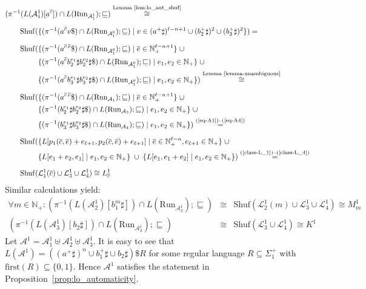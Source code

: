 \documentclass[envcountsame]{llncs}
\newcommand{\A}{\mathcal A}
\newcommand{\first}{\mathrm{first}}
\renewcommand{\L}{\mathcal L}
\newcommand{\N}{\mathbb N}
\renewcommand{\L}{\mathcal L}
\newcommand{\Run}{\mathrm{Run}}
\newcommand{\Shuf}{\mathrm{Shuf}}
\begin{document}
\begin{align*}
& (\pi^{-1}(L(\A^1_1)[a^{\overline{c}}]) \cap L(\Run_{\A^1_1}); \sqsubseteq) 
\stackrel{\text{Lemma~\ref{lem:lo_aut_shuf}}}{\cong} \\[2mm]
& \qquad \Shuf(\{(\pi^{-1}(a^{\overline{c}} v \$) \cap L(\Run_{\A^0_1}); \sqsubseteq) \mid v\in (a^+\sharp)^{\ell-n+1} \cup
    (b_2^+\sharp)^2  \cup (b_3^+\sharp)^2 \}) = \\[2mm]
& \qquad \Shuf(\{(\pi^{-1}(a^{\overline{c}\,\overline{e}} \$) \cap
                  L(\Run_{\A^0_1}); \sqsubseteq) \mid \overline{e} \in
                  \N_+^{\ell-n+1} \} \; \cup \\
& \qquad \phantom{\Shuf(} \{(\pi^{-1}(a^{\overline{c}} b_2^{e_1}\sharp b_2^{e_2}\sharp \$) \cap
                  L(\Run_{\A^0_1}); \sqsubseteq) \mid e_1,e_2 \in \N_+ \} \; \cup \\
& \qquad \phantom{\Shuf(} \{(\pi^{-1}(a^{\overline{c}} b_3^{e_1}\sharp b_3^{e_2}\sharp \$) \cap
                  L(\Run_{\A^0_1}); \sqsubseteq) \mid e_1,e_2 \in \N_+ \})\stackrel{\text{Lemma~\ref{lemma-unambiguous}}}{\cong}  \\[2mm]
& \qquad \Shuf(\{(\pi^{-1}(a^{\overline{c}\,\overline{e}} \$) \cap
                  L(\Run_{\A_1}); \sqsubseteq) \mid \overline{e} \in
                  \N_+^{\ell-n+1} \} \; \cup \\
& \qquad \phantom{\Shuf(} \{(\pi^{-1}(b_2^{e_1}\sharp b_2^{e_2}\sharp \$) \cap
                  L(\Run_{\A_3}); \sqsubseteq) \mid e_1,e_2 \in \N_+ \} \; \cup \\
& \qquad \phantom{\Shuf(} \{(\pi^{-1}(b_3^{e_1}\sharp b_3^{e_2}\sharp \$) \cap
                  L(\Run_{\A_4}); \sqsubseteq) \mid e_1,e_2 \in \N_+ \})
                  \stackrel{\text{(\ref{eq-A1})--(\ref{eq-A4})}}{=} \\[2mm]
& \qquad \Shuf(\{ L[p_1(\overline{c}, \overline{e})+e_{\ell+1}, 
   p_2(\overline{c},\overline{e})+e_{\ell+1}] \mid \overline{e} \in
                  \N_+^{\ell-n}, e_{\ell+1} \in \N_+ \} \; \cup \\
& \qquad \phantom{\Shuf(} \{ L[e_1+e_2,e_1]  \mid e_1,e_2 \in \N_+ \} \; \cup
\; \{ L[e_1, e_1+e_2]  \mid e_1,e_2 \in \N_+ \}) \stackrel{\text{(\ref{class-L_1})--(\ref{class-L_4})}}{=} \\[2mm]
& \qquad \Shuf( \L^1_1(\overline{c})\cup \L^1_3 \cup \L^1_4) \cong L^1_{\overline{c}}
\end{align*}
Similar calculations yield:
\begin{eqnarray*} 
\forall m\in \N_+ : 
(\pi^{-1}(L(\A^1_2)[b_1^m \sharp]) \cap L(\Run_{\A^1_2}); \sqsubseteq) 
& \cong & \Shuf(\L^1_2(m) \cup \L^1_3 \cup \L^1_4) \cong M^1_m \\ 
(\pi^{-1}(L(\A^1_3)[b_2\sharp])\cap L(\Run_{\A^1_3}); \sqsubseteq) & \cong & \Shuf(\L^1_3 \cup \L^1_4) \cong K^1
\end{eqnarray*}
Let $\A^1 =  \A^1_1\uplus \A^1_2 \uplus \A^1_3$. It is easy to see that  
$L(\A^1) = ( (a^+\sharp)^n \cup b_1^+ \sharp \cup b_2 \sharp) \$ R$ for some 
regular language $R \subseteq \Sigma_1^+$ with $\first(R)
\subseteq \{0,1\}$. Hence $\A^1$ satisfies the statement 
in Proposition~\ref{prop:lo_automaticity}.
\end{document}
